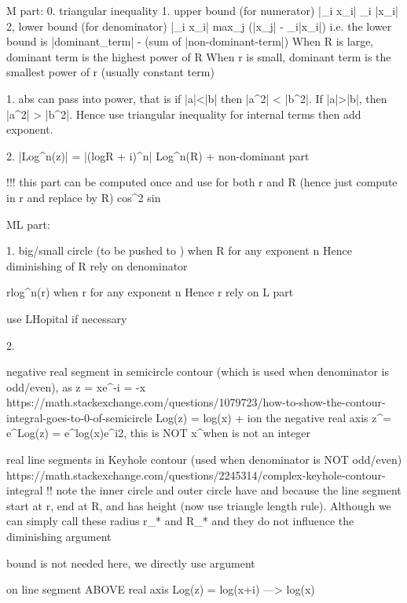 M part:
0. triangular inequality
	1. upper bound (for numerator) |\sum_i x_i| \leq \sum_i |x_i|
	2, lower bound (for denominator) |\sum_i x_i| \geq max_j (|x_j| - \sum_i|x_i|)
		i.e. the lower bound is |dominant_term| - (sum of |non-dominant-term|)
		When R is large, dominant term is the highest power of R
		When r is small, dominant term is the smallest power of r (usually constant term)
	
1. abs can pass into power, that is if |a|<|b| then |a^2| < |b^2|. If |a|>|b|, then |a^2| > |b^2|. Hence use triangular inequality for internal terms then add exponent.



2. |Log^n(z)| = |(logR + i\theta)^n| \leq Log^n(R) + non-dominant part


!!! this part can be computed once and use for both r and R (hence just compute in r and replace by R)
cos^2
sin




ML part:

1. big/small circle (to be pushed to \infty)
  when R \to \infty for any exponent n
Hence diminishing of R \to \infty rely on denominator

rlog^n(r)  when r  for any exponent n
Hence r  rely on L part

use LHopital if necessary

2. 

negative real segment in semicircle contour (which is used when denominator is odd/even), as z = xe^{-i\pi} = -x
	https://math.stackexchange.com/questions/1079723/how-to-show-the-contour-integral-goes-to-0-of-semicircle
	Log(z) = log(x) + i\pi on the negative real axis
	z^\alpha = e^{\alpha Log(z)} = e^{\alpha log(x)}e^{\alpha i2\pi}, this is NOT x^\alpha when \alpha is not an integer


real line segments in Keyhole contour (used when denominator is NOT odd/even)
	https://math.stackexchange.com/questions/2245314/complex-keyhole-contour-integral
	!! note the inner circle and outer circle have  and  because the line segment start at r, end at R, and has height \delta (now use triangle length rule). Although we can simply call these radius r_* and R_* and they do not influence the diminishing argument
	
	bound is not needed here, we directly use \delta {} argument
	
	on line segment ABOVE real axis
		Log(z) = log(x+i\delta) ---> log(x)
	
